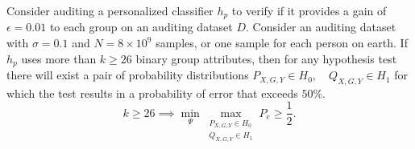 \begin{corollary} 
 Consider auditing a personalized classifier $h_p$ to verify if it provides a gain of $\epsilon =0.01$ to each group on an auditing dataset $D$. Consider an auditing dataset with $\sigma=0.1$ and $N = 8 \times 10^9$ samples, or one sample for each person on earth. If $h_p$ uses more than $k \geq 26$ binary group attributes, then for any hypothesis test there will exist a pair of probability distributions $P_{X,G,Y} \in H_0, \quad Q_{X,G,Y} \in H_1$ for which the test results in a probability of error that exceeds $50 \%$. 
\begin{equation}
       k \geq 26 \implies \min_{\Psi} \max_{\substack{P_{X,G,Y} \in H_0 \\ Q_{X,G,Y} \in H_1}} P_e \geq \frac{1}{2}.
\end{equation}
\end{corollary}







